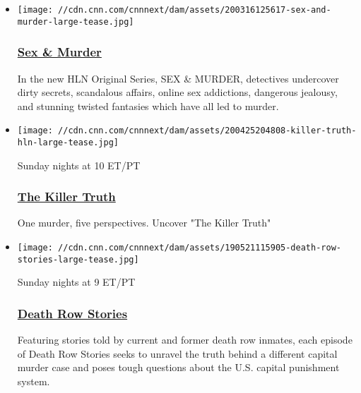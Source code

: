 \begin{itemize}
\item
  \href{https://cnncreativemarketing.com/project/sex-murder/}{}

  \texttt{[image: //cdn.cnn.com/cnnnext/dam/assets/200316125617-sex-and-murder-large-tease.jpg]}

  \hypertarget{sex--murder}{%
  \subsubsection{\texorpdfstring{\href{https://cnncreativemarketing.com/project/sex-murder/}{Sex
  \& Murder}}{Sex \& Murder}}\label{sex--murder}}

  In the new HLN Original Series, SEX \& MURDER, detectives undercover
  dirty secrets, scandalous affairs, online sex addictions, dangerous
  jealousy, and stunning twisted fantasies which have all led to murder.
\end{itemize}

\begin{itemize}
\item
  \href{https://www.cnncreativemarketing.com/project/the-killer-truth/}{}

  \texttt{[image: //cdn.cnn.com/cnnnext/dam/assets/200425204808-killer-truth-hln-large-tease.jpg]}

  Sunday nights at 10 ET/PT

  \hypertarget{the-killer-truth}{%
  \subsubsection{\texorpdfstring{\href{https://www.cnncreativemarketing.com/project/the-killer-truth/}{The
  Killer Truth}}{The Killer Truth}}\label{the-killer-truth}}

  One murder, five perspectives. Uncover "The Killer Truth"
\end{itemize}

\begin{itemize}
\item
  \href{https://cnncreativemarketing.com/project/drs/}{}

  \texttt{[image: //cdn.cnn.com/cnnnext/dam/assets/190521115905-death-row-stories-large-tease.jpg]}

  Sunday nights at 9 ET/PT

  \hypertarget{death-row-stories}{%
  \subsubsection{\texorpdfstring{\href{https://cnncreativemarketing.com/project/drs/}{Death
  Row Stories}}{Death Row Stories}}\label{death-row-stories}}

  Featuring stories told by current and former death row inmates, each
  episode of Death Row Stories seeks to unravel the truth behind a
  different capital murder case and poses tough questions about the U.S.
  capital punishment system.
\end{itemize}

